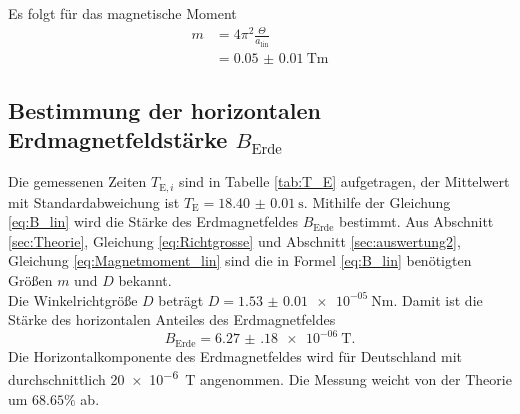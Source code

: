 Es folgt für das magnetische Moment
\begin{align}
	m 	&= 4\pi^2\frac{\Theta}{a_\text{lin}}\\
		&= \SI{0.05(1)}{\tesla\meter}
	\label{eq:Magnetmoment_lin}
\end{align}
\subsection{Bestimmung der horizontalen \texorpdfstring{Erdmagnetfeldstärke $B_\text{Erde}$}{Magnetfeldstärke B der Erde}}
\label{sec:auswertung3}

Die gemessenen Zeiten $T_{\text{E},i}$ sind in Tabelle \ref{tab:T_E} aufgetragen, der Mittelwert mit Standardabweichung ist
$T_\text{E}=\SI{18.40(1)}{\second}$.\newpage
Mithilfe der Gleichung \eqref{eq:B_lin} wird die Stärke des Erdmagnetfeldes $B_\text{Erde}$ bestimmt.
Aus Abschnitt \ref{sec:Theorie}, Gleichung \eqref{eq:Richtgrosse} und Abschnitt \ref{sec:auswertung2}, Gleichung \eqref{eq:Magnetmoment_lin} sind die in Formel \eqref{eq:B_lin} benötigten Größen $m$ und $D$ bekannt.\\
Die Winkelrichtgröße $D$ beträgt
$D = \SI{1.53(1)e-05}{\newton\meter}$.
Damit ist die Stärke des horizontalen Anteiles des Erdmagnetfeldes
\begin{equation}
	B_\text{Erde}=\SI{6.27(18)e-06}{\tesla}.
\end{equation}
Die Horizontalkomponente des Erdmagnetfeldes wird für Deutschland mit durchschnittlich \SI{20e-6}{\tesla} \cite{lausitz} angenommen.
Die Messung weicht von der Theorie um $68.65\%$ ab.

